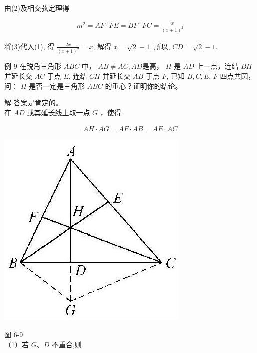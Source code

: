 \documentclass[10pt]{article}
\begin{document}
由(2)及相交弦定理得

\begin{align*}
m^{2}=A F \cdot F E=B F \cdot F C=\frac{x}{(x+1)^{2}} \tag{3}
\end{align*}

将(3)代入(1), 得 $\frac{2 x}{(x+1)^{2}}=x$, 解得 $x=\sqrt{2}-1$. 所以, $C D=\sqrt{2}-1$.

例 9 在锐角三角形 $A B C$ 中， $A B \neq A C, A D$是高， $H$ 是 $A D$ 上一点，连结 $B H$ 并延长交 $A C$ 于点 $E$, 连结 $C H$ 并延长交 $A B$ 于点 $F$, 已知 $B, C, E$, $F$ 四点共圆，问： $H$ 是否一定是三角形 $A B C$ 的垂心？证明你的结论。

解 答案是肯定的。\\
在 $A D$ 或其延长线上取一点 $G$ ，使得

\begin{align*}
A H \cdot A G=A F \cdot A B=A E \cdot A C
\end{align*}

\begin{center}
\includegraphics[max width=\textwidth]{2024_10_30_66b8e5e701da2093c133g-048}
\end{center}

图 6-9\\
（1）若 $G 、 D$ 不重合,则
\end{document}
